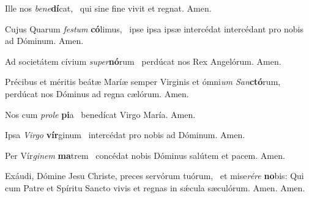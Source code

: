 \documentclass[invitatoriale-romanum.tex]{subfiles}
\begin{document}

Ille nos \textit{bene}\textbf{dí}cat,~\GreSpecial{*}
qui sine fine vivit et regnat.
\hspace{\specialcharhsep}\rr Amen.

Cujus  Quarum\rubric{)} \textit{festum} \textbf{có}limus,~\GreSpecial{*}
ipse  ipsa  ipsæ\rubric{)}
intercédat  intercédant\rubric{)} pro nobis ad Dóminum.
\hspace{\specialcharhsep}\rr Amen.

Ad societátem cívium \textit{super}\textbf{nó}rum~\GreSpecial{*}
perdúcat nos Rex Angelórum.
\hspace{\specialcharhsep}\rr Amen.

\pagebreak

\null



Précibus et méritis beátæ Maríæ semper Virginis
et ómni\textit{um San}\textbf{ctó}rum,~\GreSpecial{*}
perdúcat nos Dóminus ad regna cælórum.
\hspace{\specialcharhsep}\rr Amen.


Nos cum \textit{prole} \textbf{pi}a~\GreSpecial{*}
benedícat Virgo María.
\hspace{\specialcharhsep}\rr Amen.

Ipsa \textit{Virgo} \textbf{vír}ginum~\GreSpecial{*}
intercédat pro nobis ad Dóminum.
\hspace{\specialcharhsep}\rr Amen.

Per Vír\textit{ginem} \textbf{ma}trem~\GreSpecial{*}
concédat nobis Dóminus salútem et pacem.
\hspace{\specialcharhsep}\rr Amen.



Exáudi, Dómine Jesu Christe, preces servórum tuórum,~\GreSpecial{+} 
et mise\textit{rére} \textbf{no}bis: Qui cum Patre et Spíritu Sancto 
vivis et regnas in sǽcula sæculórum. Amen.
\hspace{\specialcharhsep}\rr Amen.
\end{document}
